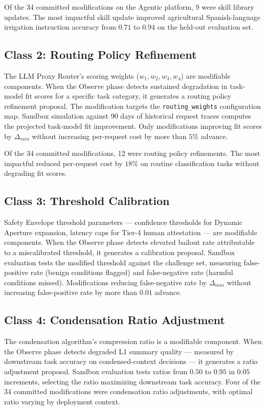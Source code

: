 \documentclass[12pt]{article}
\begin{document}
Of the 34 committed modifications on the Agentic platform, 9 were skill library updates. The most impactful skill update improved agricultural Spanish-language irrigation instruction accuracy from $0.71$ to $0.94$ on the held-out evaluation set.

\subsection{Class 2: Routing Policy Refinement}
The LLM Proxy Router's scoring weights ($w_1, w_2, w_3, w_4$) are modifiable components. When the Observe phase detects sustained degradation in task-model fit scores for a specific task category, it generates a routing policy refinement proposal. The modification targets the \texttt{routing\_weights} configuration map. Sandbox simulation against 90 days of historical request traces computes the projected task-model fit improvement. Only modifications improving fit scores by $\Delta_{min}$ without increasing per-request cost by more than $5\%$ advance.

Of the 34 committed modifications, 12 were routing policy refinements. The most impactful reduced per-request cost by $18\%$ on routine classification tasks without degrading fit scores.

\subsection{Class 3: Threshold Calibration}
Safety Envelope threshold parameters --- confidence thresholds for Dynamic Aperture expansion, latency caps for Tier-4 human attestation --- are modifiable components. When the Observe phase detects elevated bailout rate attributable to a miscalibrated threshold, it generates a calibration proposal. Sandbox evaluation tests the modified threshold against the challenge set, measuring false-positive rate (benign conditions flagged) and false-negative rate (harmful conditions missed). Modifications reducing false-negative rate by $\Delta_{min}$ without increasing false-positive rate by more than $0.01$ advance.

\subsection{Class 4: Condensation Ratio Adjustment}
The condensation algorithm's compression ratio is a modifiable component. When the Observe phase detects degraded L1 summary quality --- measured by downstream task accuracy on condensed-context decisions --- it generates a ratio adjustment proposal. Sandbox evaluation tests ratios from $0.50$ to $0.95$ in $0.05$ increments, selecting the ratio maximizing downstream task accuracy. Four of the 34 committed modifications were condensation ratio adjustments, with optimal ratio varying by deployment context.
\end{document}
